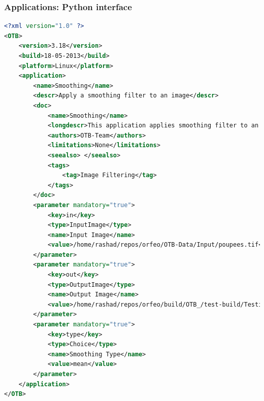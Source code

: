 \documentclass[8pt]{beamer}
\begin{document}
\begin{frame}[fragile]
\frametitle{Applications: Python interface}
\begin{lstlisting}[language=xml,breaklines=true,breakatwhitespace=true,frame = tb,framerule = 0.25pt,fontadjust,backgroundcolor={\color{listlightgray}},basicstyle = {\ttfamily\tiny},keywordstyle = {\ttfamily\color{listkeyword}\textbf},identifierstyle = {\ttfamily},commentstyle = {\ttfamily\color{listcomment}\textit},stringstyle = {\ttfamily},showstringspaces = false,showtabs = false,numbers = none,numbersep = 6pt, numberstyle={\ttfamily\color{listnumbers}},tabsize = 2]
<?xml version="1.0" ?>
<OTB>
    <version>3.18</version>
    <build>18-05-2013</build>
    <platform>Linux</platform>
    <application>
        <name>Smoothing</name>
        <descr>Apply a smoothing filter to an image</descr>
        <doc>
            <name>Smoothing</name>
            <longdescr>This application applies smoothing filter to an image. Either gaussian, mean, or anisotropic diffusion are available.</longdescr>
            <authors>OTB-Team</authors>
            <limitations>None</limitations>
            <seealso> </seealso>
            <tags>
                <tag>Image Filtering</tag>
            </tags>
        </doc>
        <parameter mandatory="true">
            <key>in</key>
            <type>InputImage</type>
            <name>Input Image</name>
            <value>/home/rashad/repos/orfeo/OTB-Data/Input/poupees.tif</value>
        </parameter>
        <parameter mandatory="true">
            <key>out</key>
            <type>OutputImage</type>
            <name>Output Image</name>
            <value>/home/rashad/repos/orfeo/build/OTB_/test-build/Testing/Temporary/apTvUtSmoothingTest_OutXML.tif</value>
        </parameter>
        <parameter mandatory="true">
            <key>type</key>
            <type>Choice</type>
            <name>Smoothing Type</name>
            <value>mean</value>
        </parameter>
    </application>
</OTB>
\end{lstlisting}
\end{frame}
\end{document}
